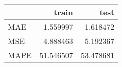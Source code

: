 \begin{tabular}{lrr}
\toprule
{} &      train &       test \\
\midrule
MAE  &   1.559997 &   1.618472 \\
MSE  &   4.888463 &   5.192367 \\
MAPE &  51.546507 &  53.478681 \\
\bottomrule
\end{tabular}

